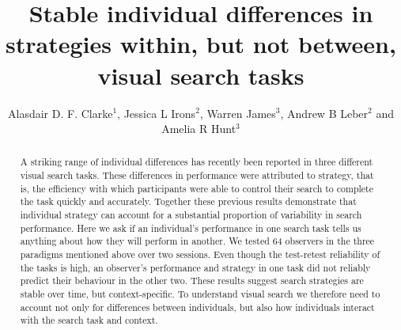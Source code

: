 \documentclass[]{rsos}%
\begin{document}
\title{Stable individual differences in strategies within, but not between, visual search tasks}

\author{%
Alasdair D. F. Clarke$^1$, Jessica L Irons$^2$, Warren James$^3$, Andrew B Leber$^2$ and Amelia R Hunt$^3$}

\address{$^{1}$Department of Psychology, University of Essex, Colchester, UK\\
$^{2}$Department of Psychology, The Ohio State University, Columbus, USA\\
$^{3}$School of Psychology, University of Aberdeen, Aberdeen, UK}

\subject{Behaviour, evolution}



\begin{abstract}
A striking range of individual differences has recently been reported in three different visual search tasks. These differences in performance were attributed to strategy, that is, the efficiency with which participants were able to control their search to complete the task quickly and accurately. Together these previous results demonstrate that individual strategy can account for a substantial proportion of variability in search performance. Here we ask if an individual’s performance in one search task tells us anything about how they will perform in another. We tested 64 observers in the three paradigms mentioned above over two sessions. Even though the test-retest reliability of the tasks is high, an observer’s performance and strategy in one task did not reliably predict their behaviour in the other two. These results suggest search strategies are stable over time, but context-specific. To understand visual search we therefore need to account not only for differences between individuals, but also how individuals interact with the search task and context. 
\end{abstract}

\end{document}
